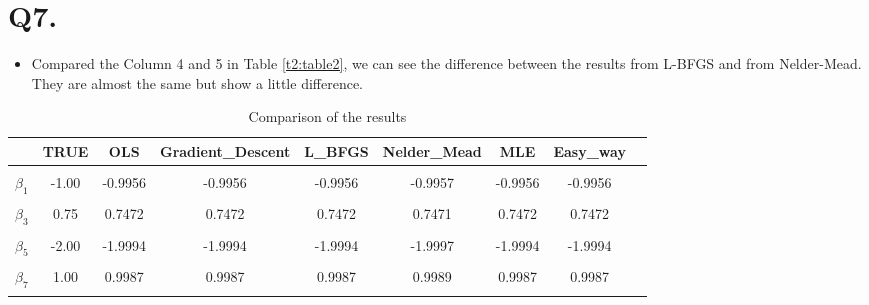 \documentclass{article}
\begin{document}
\section*{Q7.}
\begin{itemize}
	\item Compared the Column 4 and 5 in Table \ref{t2:table2}, we can see the difference between the results from L-BFGS and from Nelder-Mead. They are almost the same but show a little difference.
\end{itemize}

\begin{table}[!h]
	\centering
	\caption{Comparison of the results}
	\centering
	\begin{tabular}[t]{ccccccccc}
		\toprule 
		 & TRUE & OLS & Gradient\_Descent & L\_BFGS & Nelder\_Mead & MLE & Easy\_way\\
		 \midrule
		\cellcolor{gray!10}{Constant} & \cellcolor{gray!10}{1.50} & \cellcolor{gray!10}{1.5006} & \cellcolor{gray!10}{1.5006} & \cellcolor{gray!10}{1.5006} & \cellcolor{gray!10}{1.5003} & \cellcolor{gray!10}{1.5006} & \cellcolor{gray!10}{1.5006}\\
		$\beta_{1}$ & -1.00 & -0.9956 & -0.9956 & -0.9956 & -0.9957 & -0.9956 & -0.9956 \\
		\cellcolor{gray!10}{$\beta_{2}$} & \cellcolor{gray!10}{-0.25} & \cellcolor{gray!10}{-0.2486} & \cellcolor{gray!10}{-0.2486} & \cellcolor{gray!10}{-0.2486} & \cellcolor{gray!10}{-0.2483} & \cellcolor{gray!10}{-0.2486} & \cellcolor{gray!10}{-0.2486}\\
		$\beta_{3}$ & 0.75 & 0.7472 & 0.7472 & 0.7472 & 0.7471 & 0.7472 & 0.7472\\
		\cellcolor{gray!10}{$\beta_{4}$} & \cellcolor{gray!10}{3.50} & \cellcolor{gray!10}{3.5018} & \cellcolor{gray!10}{3.5018} & \cellcolor{gray!10}{3.5018} & \cellcolor{gray!10}{3.5016} & \cellcolor{gray!10}{3.5018} & \cellcolor{gray!10}{3.5018}\\\addlinespace
		$\beta_{5}$ & -2.00 & -1.9994 & -1.9994 & -1.9994 & -1.9997 & -1.9994 & -1.9994\\
		\cellcolor{gray!10}{$\beta_{6}$} & \cellcolor{gray!10}{0.50} & \cellcolor{gray!10}{0.5011} & \cellcolor{gray!10}{0.5011} & \cellcolor{gray!10}{0.5011} & \cellcolor{gray!10}{0.5013} & \cellcolor{gray!10}{0.5011} & \cellcolor{gray!10}{0.5011}\\
		$\beta_{7}$ & 1.00 & 0.9987 & 0.9987 & 0.9987 & 0.9989 & 0.9987 & 0.9987\\
		\cellcolor{gray!10}{$\beta_{8}$} & \cellcolor{gray!10}{1.25} & \cellcolor{gray!10}{1.2528} & \cellcolor{gray!10}{1.2528} & \cellcolor{gray!10}{1.2528} & \cellcolor{gray!10}{1.2527} & \cellcolor{gray!10}{1.2528} & \cellcolor{gray!10}{1.2528}\\

\end{tabular}
\end{table}
\end{document}
